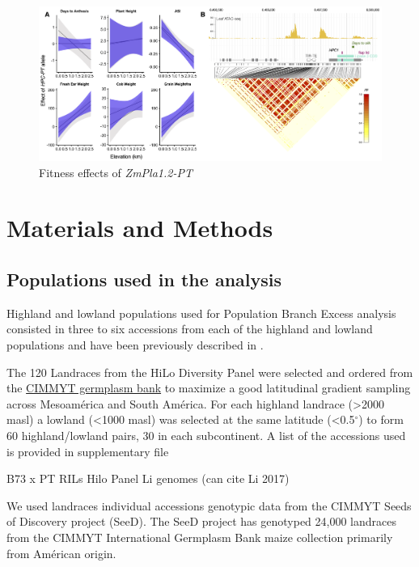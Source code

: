 \documentclass[9pt,twocolumn,twoside]{BioRxiv}
\begin{document}
\begin{figure}[h]
\begin{center}
\includegraphics[width=0.8\paperwidth]{Figures/Fig_5.png}
\caption{Fitness effects of \textit{ZmPla1.2-PT}} 
\label{Fig5}
\end{center}
\end{figure}   


\section{Materials and Methods}
\label{sec:materials:methods}

\subsection{Populations used in the analysis } 
Highland and lowland populations used for Population Branch Excess analysis consisted in three to six accessions from each of the highland and lowland populations and have been previously described in \cite{Wang2020-mp, Wang2017-bc}. 


The 120 Landraces from the HiLo Diversity Panel were selected and ordered from the \href{http://mgb.cimmyt.org/gringlobal/search.aspx}{CIMMYT germplasm bank} to maximize a good latitudinal gradient sampling across Mesoamérica and South América. For each highland landrace (>2000 masl) a lowland (<1000 masl) was selected at the same latitude (<0.5$^{\circ}$) to form 60 highland/lowland pairs, 30 in each subcontinent. A list of the accessions used is provided in supplementary file  


B73 x PT RILs
Hilo Panel
Li genomes (can cite Li 2017)

We used landraces individual accessions genotypic data from the CIMMYT Seeds of Discovery project (SeeD). The SeeD project has genotyped 24,000 landraces from the  CIMMYT International Germplasm Bank maize collection primarily from Américan origin.
\end{document}
